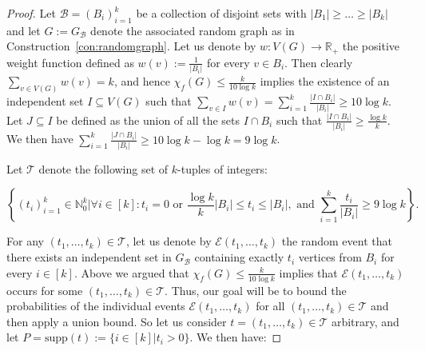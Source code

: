\documentclass[a4paper,10pt]{amsart}
\begin{document}
\begin{proof}
Let $\mathcal{B}=(B_i)_{i=1}^{k}$ be a collection of disjoint sets with $|B_1|\ge \dots\ge |B_k|$ and let $G:=G_{\mathcal{B}}$ denote the associated random graph as in Construction~\ref{con:randomgraph}. Let us denote by $w:V(G)\rightarrow \mathbb{R}_+$ the positive weight function defined as $w(v):=\frac{1}{|B_i|}$ for every $v\in B_i$. Then clearly $\sum_{v\in V(G)}{w(v)}=k$, and hence $\chi_f(G)\le \frac{k}{10\log k}$ implies the existence of an independent set $I\subseteq V(G)$ such that $\sum_{v \in I}{w(v)}=\sum_{i=1}^{k}\frac{|I\cap B_i|}{|B_i|}\ge 10\log k$. Let $J\subseteq I$ be defined as the union of all the sets $I\cap B_i$ such that $\frac{|I\cap B_i|}{|B_i|}\ge \frac{\log k}{k}$. We then have $\sum_{i=1}^{k}{\frac{|J\cap B_i|}{|B_i|}}\ge 10\log k-\log k=9\log k$.

Let $\mathcal{T}$ denote the following set of $k$-tuples of integers:

$$\left\{(t_i)_{i=1}^{k}\in \mathbb{N}_0^k\bigg\vert\forall i\in [k]: t_i=0 \text{ or }\frac{\log k}{k}|B_i|\le t_i\le |B_i|, \text{ and }\sum_{i=1}^{k}\frac{t_i}{|B_i|}\ge 9\log k\right\}.$$

For any $(t_1,\ldots,t_k) \in \mathcal{T}$, let us denote by $\mathcal{E}(t_1,\ldots,t_k)$ the random event that there exists an independent set in $G_{\mathcal{B}}$ containing exactly $t_i$ vertices from $B_i$ for every $i\in [k]$. Above we argued that $\chi_f(G)\le \frac{k}{10\log k}$ implies that $\mathcal{E}(t_1,\ldots,t_k)$ occurs for some  $(t_1,\ldots,t_k)\in \mathcal{T}$.
Thus, our goal will be to bound the probabilities of the individual events  $\mathcal{E}(t_1,\ldots,t_k)$ for all $(t_1,\ldots,t_k)\in \mathcal{T}$ and then apply a union bound.
So let us consider $t=(t_1,\ldots,t_k)\in \mathcal{T}$ arbitrary, and let $P=\mathrm{supp}(t):=\{i\in [k]|t_i>0\}$. We then have:


\end{proof}
\end{document}
